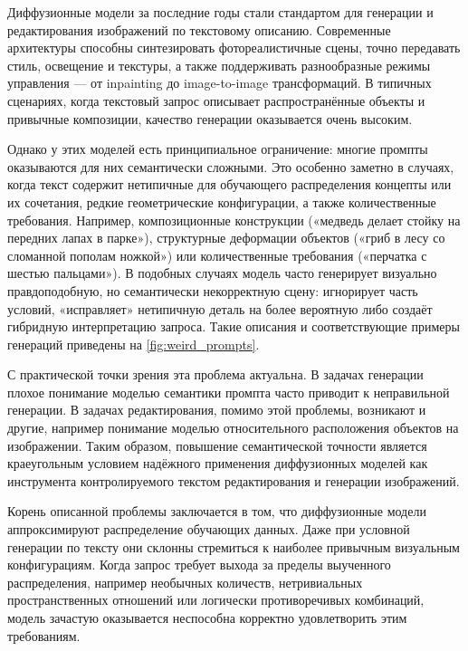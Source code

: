 Диффузионные модели за последние годы стали стандартом для генерации и редактирования изображений по текстовому описанию. Современные архитектуры способны синтезировать фотореалистичные сцены, точно передавать стиль, освещение и текстуры, а также поддерживать разнообразные режимы управления — от inpainting \cite{mao2025unifyedit} до image-to-image \cite{blackforestlabs2025fluxkontext} трансформаций. В типичных сценариях, когда текстовый запрос описывает распространённые объекты и привычные композиции, качество генерации оказывается очень высоким.

Однако у этих моделей есть принципиальное ограничение: многие промпты оказываются для них семантически сложными. Это особенно заметно в случаях, когда текст содержит нетипичные для обучающего распределения концепты или их сочетания, редкие геометрические конфигурации, а также количественные требования. Например, композиционные конструкции («медведь делает стойку на передних лапах в парке»), структурные деформации объектов («гриб в лесу со сломанной пополам ножкой») или количественные требования («перчатка с шестью пальцами»). В подобных случаях модель часто генерирует визуально правдоподобную, но семантически некорректную сцену: игнорирует часть условий, «исправляет» нетипичную деталь на более вероятную либо создаёт гибридную интерпретацию запроса. Такие описания и соответствующие примеры генераций приведены на \autoref{fig:weird_prompts}.

С практической точки зрения эта проблема актуальна. В задачах генерации плохое понимание моделью семантики промпта часто приводит к неправильной генерации. В задачах редактирования, помимо этой проблемы, возникают и другие, например понимание моделью относительного расположения объектов на изображении. Таким образом, повышение семантической точности является краеугольным условием надёжного применения диффузионных моделей как инструмента контролируемого текстом редактирования и генерации изображений.

Корень описанной проблемы заключается в том, что диффузионные модели аппроксимируют распределение обучающих данных. Даже при условной генерации по тексту они склонны стремиться к наиболее привычным визуальным конфигурациям. Когда запрос требует выхода за пределы выученного распределения, например необычных количеств, нетривиальных пространственных отношений или логически противоречивых комбинаций, модель зачастую оказывается неспособна корректно удовлетворить этим требованиям.

\newpage

